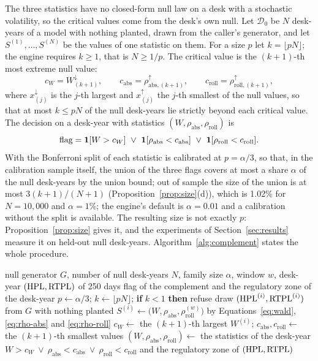 The three statistics have no closed-form null law on a desk with a stochastic volatility, so the critical values come from the desk's own null.
Let $\mathcal D_0$ be $N$ desk-years of a model with nothing planted, drawn from the caller's generator, and let $S^{(1)},\dots,S^{(N)}$ be the values of one statistic on them.
For a size $p$ let $k=\lfloor pN\rfloor$; the engine requires $k\ge1$, that is $N\ge 1/p$.
The critical value is the $(k+1)$-th most extreme null value:
\begin{equation}
c_W=W_{(k+1)}^{\downarrow},\qquad c_{\mathrm{abs}}=\rho_{\mathrm{abs},(k+1)}^{\uparrow},\qquad c_{\mathrm{roll}}=\rho_{\mathrm{roll},(k+1)}^{\uparrow},
\label{eq:critical}
\end{equation}
where $x^{\downarrow}_{(j)}$ is the $j$-th largest and $x^{\uparrow}_{(j)}$ the $j$-th smallest of the null values, so that at most $k\le pN$ of the null desk-years lie strictly beyond each critical value.
The decision on a desk-year with statistics $(W,\rho_{\mathrm{abs}},\rho_{\mathrm{roll}})$ is
\begin{equation}
\text{flag}=\indic[W>c_W]\ \vee\ \indic[\rho_{\mathrm{abs}}<c_{\mathrm{abs}}]\ \vee\ \indic[\rho_{\mathrm{roll}}<c_{\mathrm{roll}}].
\label{eq:decision}
\end{equation}
With the Bonferroni split of \citet{dunn1961} each statistic is calibrated at $p=\alpha/3$, so that, in the calibration sample itself, the union of the three flags covers at most a share $\alpha$ of the null desk-years by the union bound; out of sample the size of the union is at most $3(k+1)/(N+1)$ (Proposition~\ref{prop:size}(d)), which is 1.02\% for $N=10{,}000$ and $\alpha=1\%$; the engine's default is $\alpha=0.01$ and a calibration without the split is available.
The resulting size is not exactly $p$: Proposition~\ref{prop:size} gives it, and the experiments of Section~\ref{sec:results} measure it on held-out null desk-years.
Algorithm~\ref{alg:complement} states the whole procedure.

\begin{algorithm}[htbp]
\caption{The scale-and-level complement: calibration on a simulated null and decision on a desk-year.}
\label{alg:complement}
\begin{algorithmic}[1]
\Require null generator $G$, number of null desk-years $N$, family size $\alpha$, window $w$, desk-year $(\mathrm{HPL},\mathrm{RTPL})$ of 250 days
\Ensure flag of the complement and the regulatory zone of the desk-year
\State $p\gets\alpha/3$; $k\gets\lfloor pN\rfloor$; \textbf{if} $k<1$ \textbf{then} refuse
\State draw $(\mathrm{HPL}^{(i)},\mathrm{RTPL}^{(i)})$ from $G$ with nothing planted
\State $S^{(i)}\gets\bigl(W,\rho_{\mathrm{abs}},\rho^{(w)}_{\mathrm{roll}}\bigr)$ by Equations~\eqref{eq:wald}, \eqref{eq:rho-abs} and \eqref{eq:rho-roll}
\EndFor
\State $c_W\gets$ the $(k+1)$-th largest $W^{(i)}$; $c_{\mathrm{abs}},c_{\mathrm{roll}}\gets$ the $(k+1)$-th smallest values
\State $(W,\rho_{\mathrm{abs}},\rho_{\mathrm{roll}})\gets$ the statistics of the desk-year
\State \Return $W>c_W\ \vee\ \rho_{\mathrm{abs}}<c_{\mathrm{abs}}\ \vee\ \rho_{\mathrm{roll}}<c_{\mathrm{roll}}$ and the regulatory zone of $(\mathrm{HPL},\mathrm{RTPL})$
\end{algorithmic}
\end{algorithm}

